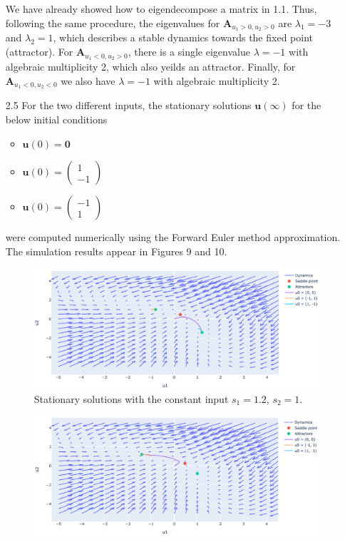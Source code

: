 \documentclass[12pt]{article}
\begin{document}
\begin{enumerate}
\[\]
We have already showed how to eigendecompose a matrix in 1.1. Thus, following the same procedure, the eigenvalues for $\mathbf{A}_{u_{1}>0, u_{2}>0}$ are $\lambda_{1}=-3$ and $\lambda_{2}=1$, which describes a stable dynamics towards the fixed point (attractor).
For $\mathbf{A}_{u_{1}<0, u_{2}>0}$, there is a single eigenvalue $\lambda=-1$ with algebraic multiplicity 2, which also yeilds an attractor.
Finally, for $\mathbf{A}_{u_{1}<0, u_{2}<0}$ we also have $\lambda=-1$ with algebraic multiplicity 2.
\item[2.5] For the two different inputs, the stationary solutions $\mathbf{u}(\infty)$ for the below initial conditions 
\begin{itemize}
 \item $\mathbf{u}(0) = \mathbf{0}$
\item $\mathbf{u}(0) = \begin{pmatrix}1\\ -1\end{pmatrix}$
\item $\mathbf{u}(0) = \begin{pmatrix}-1\\ 1\end{pmatrix}$
\end{itemize}
were computed numerically using the Forward Euler method approximation. The simulation results appear in Figures 9 and 10.
\begin{figure}[h]
    \centering
    \includegraphics[width=1.1\textwidth]{Figures/121.png}
    \caption{Stationary solutions with the constant input $s_{1}=1.2$, $s_{2}=1$.}
\end{figure} 
\begin{figure}[h]
    \centering
    \includegraphics[width=1.1\textwidth]{Figures/112.png}

\end{figure}
\end{enumerate}
\end{document}
